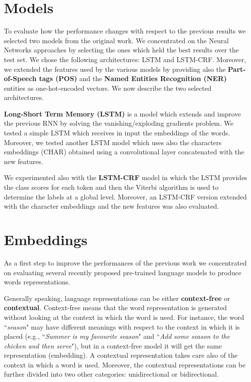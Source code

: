 \documentclass[11pt,a4paper]{article}
\begin{document}
\section{Models}

To evaluate how the performance changes with respect 
to the previous results we selected two models from 
the original work. We concentrated on the Neural 
Networks approaches by selecting the ones which held 
the best results over the test set. We chose the 
following architectures: LSTM and LSTM-CRF.  
Moreover, we extended the features used by the 
various models by providing also the \textbf{Part-of-Speech 
tags (POS)} and the \textbf{Named Entities Recognition (NER)} 
entities as one-hot-encoded vectors. We now describe the two selected architectures.

\textbf{Long-Short Term Memory (LSTM)} \cite{lstm} is a model 
which extends and improve the previous RNN by 
solving the vanishing/exploding gradients problem. 
We tested a simple LSTM which receives in input the 
embeddings of the words. Moreover, we tested another LSTM model which uses also the characters embeddings (CHAR) obtained using a convolutional layer concatenated with the new features. 

We experimented also with the \textbf{LSTM-CRF} model \cite{
yao2014recurrent, DBLP:journals/corr/HuangXY15} in 
which the LSTM provides the class scores for each 
token and then the Viterbi algorithm is used to 
determine the labels at a global level. Moreover, an 
LSTM-CRF version extended with the character 
embeddings and the new features was also evaluated.

\section{Embeddings}

As a first step to improve the performances of the previous work we concentrated on evaluating several recently proposed pre-trained language models to produce words representations.

Generally speaking, language representations can be either \textbf{context-free} or \textbf{contextual}. 
Context-free means that the word representation is generated without looking at the context in which the word is used. For instance, the word ``\textit{season}" may have different meanings with respect to the context in which it is placed (e.g., ``\textit{Summer is my favourite season}" and ``\textit{Add some season to the chicken and then serve}"), but in a context-free model it will get the same representation (embedding). A contextual representation takes care also of the context in which a word is used.
Moreover, the contextual representations can be further divided into two other categories: unidirectional or bidirectional. 
\end{document}
